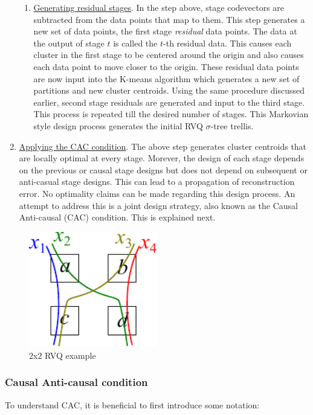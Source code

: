 \begin{enumerate}
\begin{enumerate}
\item \underline{Generating residual stages}.  In the step above, stage codevectors are subtracted from the data points that map to them.  This step generates a new set of data points, the first stage \emph{residual} data points.  The data at the output of stage $t$ is called the $t$-th residual data.  This causes each cluster in the first stage to be centered around the origin and also causes each data point to move closer to the origin.  These residual data points are now input into the K-means algorithm which generates a new set of partitions and new cluster centroids.  Using the same procedure discussed earlier, second stage residuals are generated and input to the third stage.  This process is repeated till the desired number of stages.  This Markovian style design process generates the initial RVQ $\sigma$-tree trellis.  
\end{enumerate}
\item \underline{Applying the CAC condition}.  The above step generates cluster centroids that are locally optimal at every stage.  Morever, the design of each stage depends on the previous or causal stage designs but does not depend on subsequent or anti-casual stage designs.   This can lead to a propagation of reconstruction error.  No optimality claims can be made regarding this design process.  An attempt to address this is a joint design strategy, also known as the Causal Anti-causal (CAC) condition.  This is explained next.
\end{enumerate}

\begin{figure}
\center
\includegraphics[width=0.5\textwidth]{thesis/RVQ_CAC_toyExample2_2x2.pdf}
\caption{2x2 RVQ example}
\label{fig:Figure1}
\end{figure}





\subsubsection{Causal Anti-causal condition}
To understand CAC, it is beneficial to first introduce some notation:

